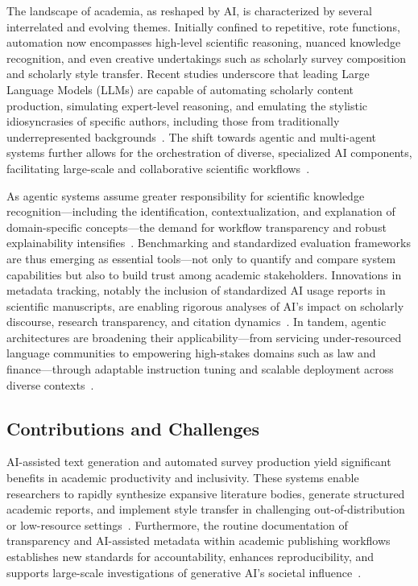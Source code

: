 \documentclass[sigconf]{acmart}
\begin{document}
The landscape of academia, as reshaped by AI, is characterized by several interrelated and evolving themes. Initially confined to repetitive, rote functions, automation now encompasses high-level scientific reasoning, nuanced knowledge recognition, and even creative undertakings such as scholarly survey composition and scholarly style transfer. Recent studies underscore that leading Large Language Models (LLMs) are capable of automating scholarly content production, simulating expert-level reasoning, and emulating the stylistic idiosyncrasies of specific authors, including those from traditionally underrepresented backgrounds~\cite{ref102,ref104}. The shift towards agentic and multi-agent systems further allows for the orchestration of diverse, specialized AI components, facilitating large-scale and collaborative scientific workflows~\cite{ref16,ref106}.

As agentic systems assume greater responsibility for scientific knowledge recognition—including the identification, contextualization, and explanation of domain-specific concepts—the demand for workflow transparency and robust explainability intensifies~\cite{ref106}. Benchmarking and standardized evaluation frameworks are thus emerging as essential tools—not only to quantify and compare system capabilities but also to build trust among academic stakeholders. Innovations in metadata tracking, notably the inclusion of standardized AI usage reports in scientific manuscripts, are enabling rigorous analyses of AI’s impact on scholarly discourse, research transparency, and citation dynamics~\cite{ref101,ref105}. In tandem, agentic architectures are broadening their applicability—from servicing under-resourced language communities to empowering high-stakes domains such as law and finance—through adaptable instruction tuning and scalable deployment across diverse contexts~\cite{ref103,ref104,ref105,ref106,ref111}.

\subsection{Contributions and Challenges}

AI-assisted text generation and automated survey production yield significant benefits in academic productivity and inclusivity. These systems enable researchers to rapidly synthesize expansive literature bodies, generate structured academic reports, and implement style transfer in challenging out-of-distribution or low-resource settings~\cite{ref104,ref105,ref106}. Furthermore, the routine documentation of transparency and AI-assisted metadata within academic publishing workflows establishes new standards for accountability, enhances reproducibility, and supports large-scale investigations of generative AI’s societal influence~\cite{ref101,ref105}.
\end{document}
